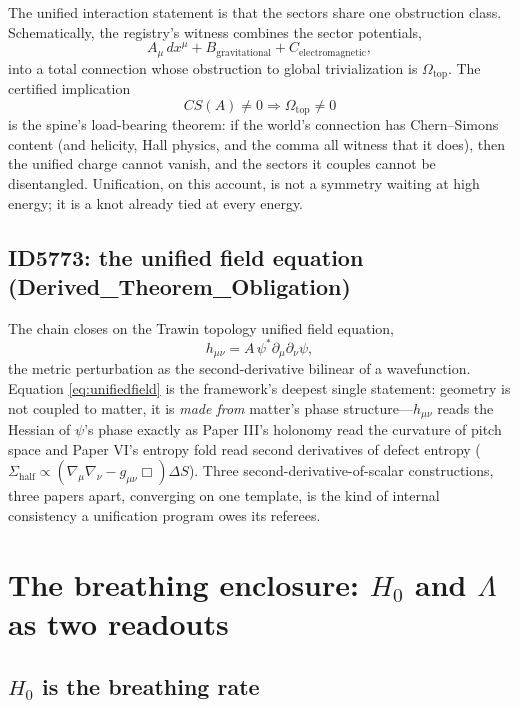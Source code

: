 \documentclass[11pt]{article}
\theoremstyle{remark}
\begin{document}
The unified interaction statement is that the sectors share one obstruction class. Schematically, the registry's witness combines the sector potentials,
\begin{equation}
A_\mu\, dx^\mu + B_{\mathrm{gravitational}} + C_{\mathrm{electromagnetic}},
\end{equation}
into a total connection whose obstruction to global trivialization is $\Omega_{\mathrm{top}}$. The certified implication
\[
CS(A) \neq 0 \Rightarrow \Omega_{\mathrm{top}} \neq 0
\]
is the spine's load-bearing theorem: if the world's connection has Chern--Simons content (and helicity, Hall physics, and the comma all witness that it does), then the unified charge cannot vanish, and the sectors it couples cannot be disentangled. Unification, on this account, is not a symmetry waiting at high energy; it is a knot already tied at every energy.

\subsection{ID5773: the unified field equation (Derived\_Theorem\_Obligation)}

The chain closes on the Trawin topology unified field equation,
\begin{equation}
h_{\mu\nu} = A\, \psi^* \partial_\mu \partial_\nu \psi,
\label{eq:unifiedfield}
\end{equation}
the metric perturbation as the second-derivative bilinear of a wavefunction. Equation \eqref{eq:unifiedfield} is the framework's deepest single statement: geometry is not coupled to matter, it is \emph{made from} matter's phase structure---$h_{\mu\nu}$ reads the Hessian of $\psi$'s phase exactly as Paper III's holonomy read the curvature of pitch space and Paper VI's entropy fold read second derivatives of defect entropy ($\Sigma_{\mathrm{half}} \propto (\nabla_\mu \nabla_\nu - g_{\mu\nu}\Box)\Delta S$). Three second-derivative-of-scalar constructions, three papers apart, converging on one template, is the kind of internal consistency a unification program owes its referees.

\section{\texorpdfstring{The breathing enclosure: $H_0$ and $\Lambda$ as two readouts}{The breathing enclosure: H0 and Lambda as two readouts}}
\label{sec:breathing}

\subsection{\texorpdfstring{$H_0$ is the breathing rate}{H0 is the breathing rate}}
\end{document}
